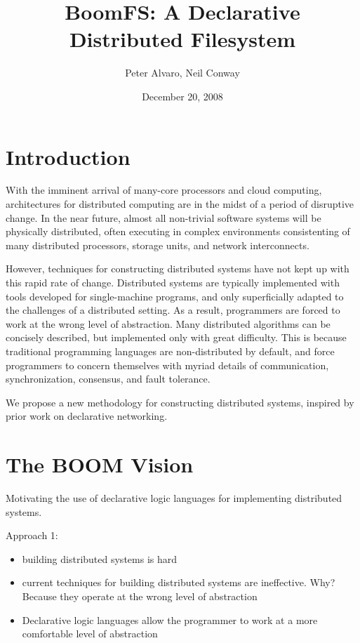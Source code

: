 \documentclass{article}
\title{BoomFS: A Declarative Distributed Filesystem}
\author{Peter Alvaro, Neil Conway}
\date{December 20, 2008}
\begin{document}
\maketitle
\begin{abstract}
\end{abstract}

\section{Introduction}
With the imminent arrival of many-core processors and cloud computing,
architectures for distributed computing are in the midst of a period
of disruptive change. In the near future, almost all non-trivial
software systems will be physically distributed, often executing in
complex environments consistenting of many distributed processors,
storage units, and network interconnects.

However, techniques for constructing distributed systems have not kept
up with this rapid rate of change. Distributed systems are typically
implemented with tools developed for single-machine programs, and only
superficially adapted to the challenges of a distributed setting. As a
result, programmers are forced to work at the wrong level of
abstraction. Many distributed algorithms can be concisely described,
but implemented only with great difficulty. This is because
traditional programming languages are non-distributed by default, and
force programmers to concern themselves with myriad details of
communication, synchronization, consensus, and fault tolerance.

We propose a new methodology for constructing distributed systems,
inspired by prior work on declarative networking.

\section{The BOOM Vision}
Motivating the use of declarative logic languages for implementing
distributed systems.

Approach 1:
\begin{itemize}
\item
  building distributed systems is hard

\item
  current techniques for building distributed systems are
  ineffective. Why? Because they operate at the wrong level of
  abstraction

\item
  Declarative logic languages allow the programmer to work at a more
  comfortable level of abstraction
\end{itemize}
\end{document}
